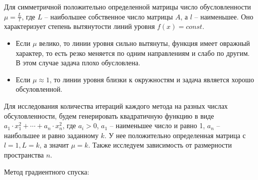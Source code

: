 \documentclass[12pt]{article}
\begin{document}
Для симметричной положительно определенной матрицы число обусловленности $\mu = \frac{L}{l}$, где $L$ -- наибольшее собственное число матрицы $A$, а $l$ -- наименьшее. Оно характеризует степень вытянутости линий уровня $f(x) = const$.

\begin{itemize}
\item Если $\mu$ велико, то линии уровня сильно вытянуты, функция имеет овражный характер, то есть резко меняется по одним направлениям и слабо по другим. В этом случае задача плохо обусловлена.
\item Если $\mu \approx 1$, то линии уровня близки к окружностям и задача является хорошо обсуловленной.
\end{itemize}

Для исследования количества итераций каждого метода на разных числах обсуловленности, будем генерировать квадратичную функцию в виде $a_1 \cdot x_1^2 + \cdots + a_n \cdot x_n^2$, где $a_i > 0$, $a_1$ -- наименьшее число и равно 1, $a_n$ -- наибольшее и равно заданному $k$. У нее положительно определенная матрица с $l = 1, L = k$, а значит $\mu = k$. Также исследуем зависимость от размерности пространства $n$.

Метод градиентного спуска:
\end{document}
